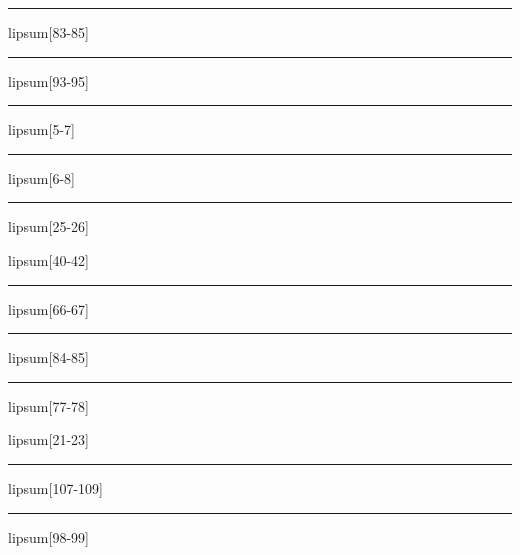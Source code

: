 \documentclass[11pt,a4paper]{article}
\begin{document}
\begin{simplewrap}
  \textcolor{magenta!30}{\rule{5.5cm}{5.3cm}}
\end{simplewrap}
lipsum[83-85]

\begin{simplewrap}
  \textcolor{magenta!23}{\rule{4.1cm}{6.4cm}}
\end{simplewrap}
lipsum[93-95]

\begin{simplewrap}
  \textcolor{blue!35}{\rule{3.0cm}{2.3cm}}
\end{simplewrap}
lipsum[5-7]

\begin{simplewrap}
  \textcolor{violet!10}{\rule{3.9cm}{3.8cm}}
\end{simplewrap}
lipsum[6-8]

\begin{simplewrap}
  \textcolor{teal!45}{\rule{4.5cm}{6.6cm}}
\end{simplewrap}
lipsum[25-26]

lipsum[40-42]

\begin{simplewrap}
  \textcolor{purple!26}{\rule{4.1cm}{6.7cm}}
\end{simplewrap}
lipsum[66-67]

\begin{simplewrap}
  \textcolor{green!46}{\rule{4.2cm}{9.3cm}}
\end{simplewrap}
lipsum[84-85]

\begin{simplewrap}
  \textcolor{cyan!41}{\rule{5.5cm}{7.5cm}}
\end{simplewrap}
lipsum[77-78]

lipsum[21-23]

\begin{simplewrap}
  \textcolor{blue!59}{\rule{4.0cm}{9.0cm}}
\end{simplewrap}
lipsum[107-109]

\begin{simplewrap}
  \textcolor{orange!59}{\rule{3.7cm}{7.2cm}}
\end{simplewrap}
lipsum[98-99]
\end{document}
